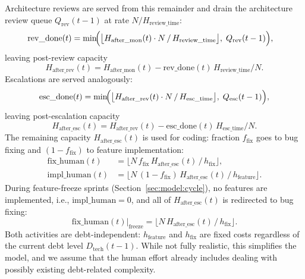 \documentclass[smallextended]{svjour3}       %
\begin{document}
Architecture reviews are served from this remainder and drain the architecture review queue $Q_\mathrm{rev}(t-1)$ at rate
$N/H_\mathrm{review\_time}$:
\begin{align}
  \mathrm{rev\_done}(t) &= \min\!\Bigl(
    \bigl\lfloor H_\mathrm{after\_mon}(t)\cdot N\,/\,H_\mathrm{review\_time}\bigr\rfloor,\;
    Q_\mathrm{rev}(t-1)\Bigr),
  \label{eq:rev_done}
\end{align}
leaving post-review capacity
\begin{equation}
  H_\mathrm{after\_rev}(t) =
    H_\mathrm{after\_mon}(t) - \mathrm{rev\_done}(t)\,H_\mathrm{review\_time}/N.
  \label{eq:hafter_rev}
\end{equation}
Escalations are served analogously:
\begin{equation}
  \mathrm{esc\_done}(t) = \min\!\Bigl(
    \bigl\lfloor H_\mathrm{after\_rev}(t)\cdot N\,/\,H_\mathrm{esc\_time}\bigr\rfloor,\;
    Q_\mathrm{esc}(t-1)\Bigr),
  \label{eq:esc_done}
\end{equation}
leaving post-escalation capacity
\begin{equation}
  H_\mathrm{after\_esc}(t) =
    H_\mathrm{after\_rev}(t) - \mathrm{esc\_done}(t)\,H_\mathrm{esc\_time}/N.
  \label{eq:hafter_esc}
\end{equation}
The remaining capacity $H_\mathrm{after\_esc}(t)$ is used for coding:
fraction $f_\mathrm{fix}$ goes to bug fixing and $(1-f_\mathrm{fix})$ to feature implementation:
\begin{align}
  \mathrm{fix\_human}(t)  &=
    \bigl\lfloor N\,f_\mathrm{fix}\,H_\mathrm{after\_esc}(t)\,/\,h_\mathrm{fix}\bigr\rfloor,
  \label{eq:fixhuman} \\
  \mathrm{impl\_human}(t) &=
    \bigl\lfloor N\,(1-f_\mathrm{fix})\,H_\mathrm{after\_esc}(t)\,/\,h_\mathrm{feature}\bigr\rfloor.
  \label{eq:implhuman}
\end{align}
During feature-freeze sprints (Section~\ref{sec:model:cycle}), no features are implemented, i.e.,
$\mathrm{impl\_human}=0$, and all of $H_\mathrm{after\_esc}(t)$ is redirected to bug fixing:
\begin{equation}
  \mathrm{fix\_human}(t)\big|_\mathrm{freeze} =
    \bigl\lfloor N\,H_\mathrm{after\_esc}(t)\,/\,h_\mathrm{fix}\bigr\rfloor.
  \label{eq:fixhuman_freeze}
\end{equation}
Both activities are debt-independent: $h_\mathrm{feature}$ and $h_\mathrm{fix}$ are fixed
costs regardless of the current debt level $D_\mathrm{tech}(t-1)$. While not fully realistic, this simplifies the model, and we assume that the human effort already includes dealing with possibly existing debt-related complexity. 
\end{document}
